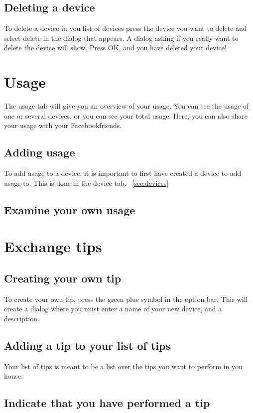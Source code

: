 \subsection{Deleting a device}
To delete a device in you list of devices press the device you want to delete and select delete in the dialog that appears. A dialog asking if you really want to delete the device will show. Press OK, and you have deleted your device!

\section{Usage}
The usage tab will give you an overview of your usage. You can see the usage of one or several devices, or you can see your total usage. Here, you can also share your usage with your Facebookfriends.
\subsection{Adding usage}
To add usage to a device, it is important to first have created a device to add usage to. This is done in the device tab. ~\ref{sec:devices}
\subsection{Examine your own usage}


\section{Exchange tips}

\subsection{Creating your own tip}
To create your own tip, press the green plus symbol in the option bar. This will create a dialog where you must enter a name of your new device, and a description. 
\subsection{Adding a tip to your list of tips}
Your list of tips is meant to be a list over the tips you want to perform in you house. 
\subsection{Indicate that you have performed a tip}

